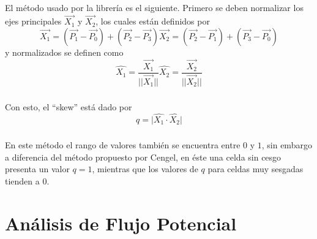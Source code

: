 \documentclass[letterpaper, openright, 12pt]{book}
\begin{document}
    \paragraph*{}
    El método usado por la librería es el siguiente. Primero se deben normalizar
    los ejes principales $\vec{X_1}$ y $\vec{X_2}$, los cuales están definidos
    por
    \begin{subequations}
    \begin{equation}
      \vec{X_1} = (\vec{P_1} - \vec{P_0}) + (\vec{P_2} - \vec{P_3})
    \end{equation}
    \begin{equation}
      \vec{X_2} = (\vec{P_2} - \vec{P_1}) + (\vec{P_3} - \vec{P_0})
    \end{equation}
    \end{subequations}
    y normalizados se definen como
    \begin{subequations}
      \begin{equation}
        \hat{X_1} = \frac{\vec{X_1}}{\lvert\lvert\vec{X_1}\rvert\rvert}
      \end{equation}
      \begin{equation}
        \hat{X_2} = \frac{\vec{X_2}}{\lvert\lvert\vec{X_2}\rvert\rvert}
      \end{equation}
    \end{subequations}

    \paragraph*{}
    Con esto, el ``skew'' está dado por
    \begin{equation}
      q = \lvert \hat{X_1} \cdot \hat{X_2} \rvert
    \end{equation}

    \paragraph*{}
    En este método el rango de valores también se encuentra entre $0$ y $1$,
    sin embargo a diferencia del método propuesto por Cengel, en éste una celda
    sin cesgo presenta un valor $q = 1$, mientras que los valores de $q$ para
    celdas muy sesgadas tienden a $0$.

%
%
%
%
%

\chapter{Análisis de Flujo Potencial}\label{chap:potential}
    \nocite{potencial_esp}
\end{document}
